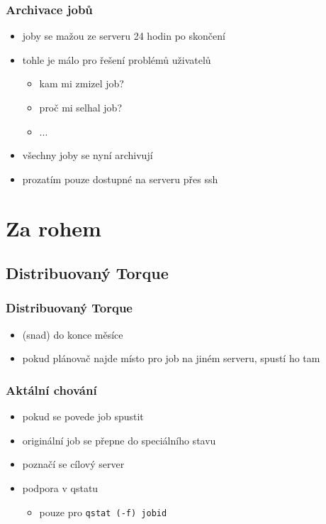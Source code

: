 \documentclass[pdftex,aspectratio=169]{beamer}
\begin{document}
\begin{frame}
	\frametitle{Archivace jobů}
	\begin{itemize}
		\item{joby se mažou ze serveru 24 hodin po skončení}
		\item{tohle je málo pro řešení problémů uživatelů}
		\begin{itemize}
			\item{kam mi zmizel job?}
			\item{proč mi selhal job?}
			\item{...}
		\end{itemize}
		\item{všechny joby se nyní archivují}
		\item{prozatím pouze dostupné na serveru přes ssh}
	\end{itemize}
\end{frame}

\section{Za rohem}
\subsection{Distribuovaný Torque}

\begin{frame}
	\frametitle{Distribuovaný Torque}
	\begin{itemize}
		\item{(snad) do konce měsíce}
		\item{pokud plánovač najde místo pro job na jiném serveru, spustí ho tam}
	\end{itemize}
\end{frame}

\begin{frame}
	\frametitle{Aktální chování}
	\begin{itemize}
		\item{pokud se povede job spustit}
		\item{originální job se přepne do speciálního stavu}
		\item{poznačí se cílový server}
		\item{podpora v qstatu}
		\begin{itemize}
			\item{pouze pro \texttt{qstat (-f) jobid}}
		\end{itemize}
	\end{itemize}
\end{frame}
\end{document}
